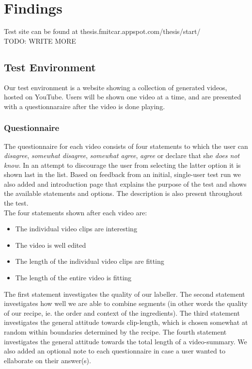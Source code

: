 %
\section{Findings}
%
Test site can be found at thesis.fmitcar.appspot.com/thesis/start/\\
TODO: WRITE MORE
%
\subsection{Test Environment}
%
Our test environment is a website showing a collection of generated videos, hosted on YouTube. Users will be shown one video at a time, and are presented with a questionnaraire after the video is done playing.
%
\subsubsection{Questionnaire}
%
%
The questionnaire for each video consists of four statements to which the user can \textit{disagree}, \textit{somewhat disagree}, \textit{somewhat agree}, \textit{agree} or declare that she \textit{does not know}. In an attempt to discourage the user from selecting the latter option it is shown last in the list. Based on feedback from an initial, single-user test run we also added and introduction page that explains the purpose of the test and shows the available statements and options. The description is also present throughout the test.\\
%
The four statements shown after each video are:
%
\begin{itemize}
\item The individual video clips are interesting
\item The video is well edited
\item The length of the individual video clips are fitting
\item The length of the entire video is fitting
\end{itemize}
%
The first statement investigates the quality of our labeller. The second statement investigates how well we are able to combine segments (in other words the quality of our recipe, ie. the order and context of the ingredients). The third statement investigates the general attitude towards clip-length, which is chosen somewhat at random within boundaries determined by the recipe. The fourth statement investigates the general attitude towards the total length of a video-summary. We also added an optional note to each questionnaire in case a user wanted to ellaborate on their answer(s).
%
